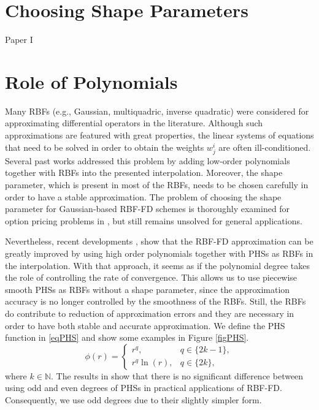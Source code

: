 \documentclass{UUThesisTemplate}
\begin{document}
\section{Choosing Shape Parameters}
Paper I
%
\section{Role of Polynomials}
Many RBFs (e.g., Gaussian, multiquadric, inverse quadratic) were considered for approximating differential operators in the literature. Although such approximations are featured with great properties, the linear systems of equations that need to be solved in order to obtain the weights $w_j^i$ are often ill-conditioned. Several past works \cite{davydov2011adaptive, fornberg2011stabilization, flyer2012guide, larsson2013stable, fornberg2013stable, flyer2016enhancing} addressed this problem by adding low-order polynomials together with RBFs into the presented interpolation. Moreover, the shape parameter, which is present in most of the RBFs, needs to be chosen carefully in order to have a stable approximation. The problem of choosing the shape parameter for Gaussian-based RBF-FD schemes is thoroughly examined for option pricing problems in \cite{paper1}, but still remains unsolved for general applications.
\par
Nevertheless, recent developments \cite{bayona2017role, flyer2016on}, show that the RBF-FD approximation can be greatly improved by using high order polynomials together with PHSs as RBFs in the interpolation. With that approach, it seems as if the polynomial degree takes the role of controlling the rate of convergence. This allows us to use piecewise smooth PHSs as RBFs without a shape parameter, since the approximation accuracy is no longer controlled by the smoothness of the RBFs. Still, the RBFs do contribute to reduction of approximation errors and they are necessary in order to have both stable and accurate approximation. We define the PHS function in \eqref{eqPHS} and show some examples in Figure \ref{figPHS}.%
\begin{equation}
\label{eqPHS}
\phi(r) =  
	\begin{cases}
		r^q, & q\in\{2k-1\}, \\
		r^q \ln(r), & q\in\{2k\},
	\end{cases}
\end{equation}
where $k \in \mathbb{N}$. The results in \cite{flyer2016on} show that there is no significant difference between using odd and even degrees of PHSs in practical applications of RBF-FD. Consequently, we use odd degrees due to their slightly simpler form.%
\end{document}
